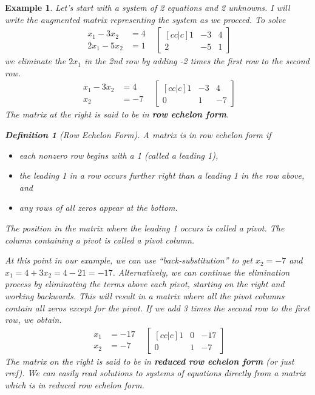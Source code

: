 \documentclass[letterpaper,oneside]{book}%
\let\oldmarginpar\marginpar
\renewcommand\marginpar[1]{\-\oldmarginpar{\raggedright\footnotesize #1}}
\theoremstyle{plain}
\theoremstyle{box}
\newtheorem{definition}[theorem]{Definition}
\newtheorem{example}[theorem]{Example}
\theoremstyle{problem}
\begin{document}
\begin{example}
Let's start with a system of 2 equations and 2 unknowns. I will write the augmented matrix representing the system as we proceed. To solve $$
\begin{array}{rr}
\begin{array}{rl}
x_1-3x_2&=4\\
2x_1-5x_2&=1 
\end{array}
&
\begin{bmatrix}[cc|c] 1&-3&4\\2&-5&1
\end{bmatrix} 
\end{array}
$$
we eliminate the $2x_1$ in the 2nd row by adding -2 times the first row to the second row.
$$\begin{array}{rr}
\begin{array}{rl}
x_1-3x_2&=4\\
x_2&=-7 
\end{array}
&
\begin{bmatrix}[cc|c] 1&-3&4\\0&1&-7
\end{bmatrix} 
\end{array}
$$
The matrix at the right is said to be in \textbf{row echelon form}. \marginpar{row echelon form} 
\begin{definition}[Row Echelon Form]
A matrix is in row echelon form if
\begin{itemize}
  \item each nonzero row begins with a 1 (called a leading 1),
  \item the leading 1 in a row occurs further right than a leading 1 in the row above, and
  \item any rows of all zeros appear at the bottom.
\end{itemize}
The position in the matrix where the leading 1 occurs is called a pivot. 
The column containing a pivot is called a pivot column. \marginpar{pivot column}
\end{definition}
At this point in our example, we can use ``back-substitution'' to get {$x_2=-7$} and {$x_1=4+3x_2 = 4-21=-17$}. 
Alternatively, we can continue the elimination process by eliminating the terms above each pivot, starting on the right and working backwards. 
This will result in a matrix where all the pivot columns contain all zeros except for the pivot. 
If we add 3 times the second row to the first row, we obtain.
$$\begin{array}{rr}
\begin{array}{rl}
x_1&=-17\\
x_2&=-7 
\end{array}
&
\begin{bmatrix}[cc|c] 1&0&-17\\0&1&-7
\end{bmatrix} 
\end{array}
$$
The matrix on the right is said to be in \textbf{reduced row echelon form} (or just rref). 
We can easily read solutions to systems of equations directly from a matrix which is in reduced row echelon form.


\end{example}
\end{document}
